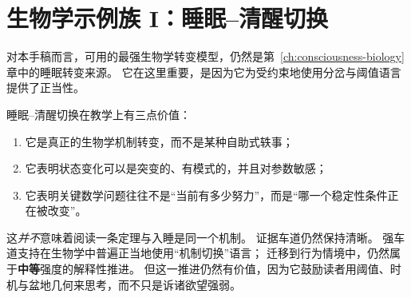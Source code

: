 \section{生物学示例族 I：睡眠--清醒切换}

对本手稿而言，可用的最强生物学转变模型，仍然是第~\ref{ch:consciousness-biology} 章中的睡眠转变来源。
它在这里重要，是因为它为受约束地使用分岔与阈值语言提供了正当性。

\begin{discussion}
睡眠--清醒切换在教学上有三点价值：
\begin{enumerate}[nosep]
  \item 它是真正的生物学机制转变，而不是某种自助式轶事；
  \item 它表明状态变化可以是突变的、有模式的，并且对参数敏感；
  \item 它表明关键数学问题往往不是“当前有多少努力”，而是“哪一个稳定性条件正在被改变”。
\end{enumerate}
\end{discussion}

这\emph{并不}意味着阅读一条定理与入睡是同一个机制。
证据车道仍然保持清晰。
强车道支持在生物学中普遍正当地使用“机制切换”语言；
迁移到行为情境中，仍然属于\textbf{中等}强度的解释性推进。
但这一推进仍然有价值，因为它鼓励读者用阈值、时机与盆地几何来思考，而不只是诉诸欲望强弱。